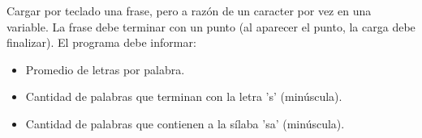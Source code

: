 Cargar por teclado una frase, pero a razón de un caracter por vez en una variable. La frase debe terminar con un punto (al aparecer el punto, la carga debe finalizar). El programa debe informar:

\begin{itemize}
	\item Promedio de letras por palabra.
	\item Cantidad de palabras que terminan con la letra 's' (minúscula).
	\item Cantidad de palabras que contienen a la sílaba 'sa' (minúscula).
\end{itemize}
